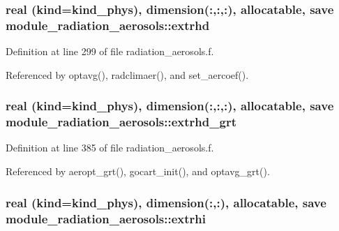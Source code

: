 \subsubsection[{\texorpdfstring{extrhd}{extrhd}}]{\setlength{\rightskip}{0pt plus 5cm}real (kind=kind\+\_\+phys), dimension(\+:,\+:,\+:), allocatable, save module\+\_\+radiation\+\_\+aerosols\+::extrhd\hspace{0.3cm}{\ttfamily [private]}}\hypertarget{namespacemodule__radiation__aerosols_a1c69f7b8ff0c98252e94def83dabfed4}{}\label{namespacemodule__radiation__aerosols_a1c69f7b8ff0c98252e94def83dabfed4}


Definition at line 299 of file radiation\+\_\+aerosols.\+f.



Referenced by optavg(), radclimaer(), and set\+\_\+aercoef().

\subsubsection[{\texorpdfstring{extrhd\+\_\+grt}{extrhd_grt}}]{\setlength{\rightskip}{0pt plus 5cm}real (kind=kind\+\_\+phys), dimension(\+:,\+:,\+:), allocatable, save module\+\_\+radiation\+\_\+aerosols\+::extrhd\+\_\+grt\hspace{0.3cm}{\ttfamily [private]}}\hypertarget{namespacemodule__radiation__aerosols_a07bfe1ada075519d1d3ceabe21b65a96}{}\label{namespacemodule__radiation__aerosols_a07bfe1ada075519d1d3ceabe21b65a96}


Definition at line 385 of file radiation\+\_\+aerosols.\+f.



Referenced by aeropt\+\_\+grt(), gocart\+\_\+init(), and optavg\+\_\+grt().

\subsubsection[{\texorpdfstring{extrhi}{extrhi}}]{\setlength{\rightskip}{0pt plus 5cm}real (kind=kind\+\_\+phys), dimension(\+:,\+:), allocatable, save module\+\_\+radiation\+\_\+aerosols\+::extrhi\hspace{0.3cm}{\ttfamily [private]}}\hypertarget{namespacemodule__radiation__aerosols_a40447f925f01790155c4d98ff8b0c04d}{}\label{namespacemodule__radiation__aerosols_a40447f925f01790155c4d98ff8b0c04d}


